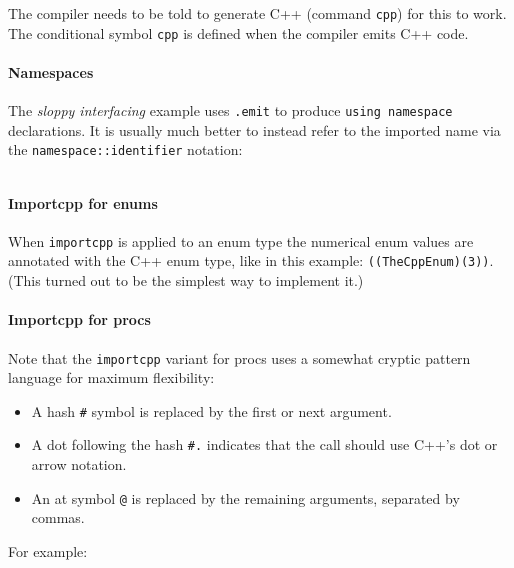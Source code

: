 The compiler needs to be told to generate C++ (command \texttt{cpp}) for
this to work. The conditional symbol \texttt{cpp} is defined when the
compiler emits C++ code.

\hypertarget{namespaces}{%
\paragraph{Namespaces}\label{namespaces}}

The \emph{sloppy interfacing} example uses \texttt{.emit} to produce
\texttt{using\ namespace} declarations. It is usually much better to
instead refer to the imported name via the
\texttt{namespace::identifier} notation:

\begin{verbatim}
\end{verbatim}

\hypertarget{importcpp-for-enums}{%
\paragraph{Importcpp for enums}\label{importcpp-for-enums}}

When \texttt{importcpp} is applied to an enum type the numerical enum
values are annotated with the C++ enum type, like in this example:
\texttt{((TheCppEnum)(3))}. (This turned out to be the simplest way to
implement it.)

\hypertarget{importcpp-for-procs}{%
\paragraph{Importcpp for procs}\label{importcpp-for-procs}}

Note that the \texttt{importcpp} variant for procs uses a somewhat
cryptic pattern language for maximum flexibility:

\begin{itemize}
\tightlist
\item
  A hash \texttt{\#} symbol is replaced by the first or next argument.
\item
  A dot following the hash \texttt{\#.} indicates that the call should
  use C++'s dot or arrow notation.
\item
  An at symbol \texttt{@} is replaced by the remaining arguments,
  separated by commas.
\end{itemize}

For example:

\begin{verbatim}
\end{verbatim}

